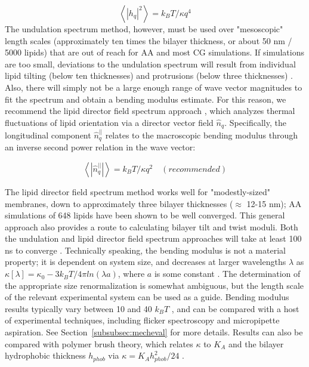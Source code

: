 \documentclass[9pt,bestpractices]{livecoms}
\begin{document}
\begin{equation}\label{eq:8}
	\left< \left|h_q \right|^2 \right> = k_BT/\kappa q^4
\end{equation}
The undulation spectrum method, however, must be used over "mesoscopic" length scales (approximately ten times the bilayer thickness, or about 50 nm / 5000 lipids) that are out of reach for AA and most CG simulations.
If simulations are too small, deviations to the undulation spectrum will result from individual lipid tilting (below ten thicknesses) and protrusions (below three thicknesses) \cite{Venable2015}.
Also, there will simply not be a large enough range of wave vector magnitudes to fit the spectrum and obtain a bending modulus estimate.
For this reason, we recommend the lipid director field spectrum approach \cite{Watson2012a,Venable2015}, which analyzes thermal fluctuations of lipid orientation via a director vector field $\hat{n}_q$.
Specifically, the longitudinal component $\hat{n}_q^{||}$ relates to the macroscopic bending modulus through an inverse second power relation in the wave vector:

\begin{equation}\label{eq:9}
	\left< \left|\hat{n}_q^{||} \right| \right> = k_BT/\kappa q^2 \quad (recommended)
\end{equation}
\parbox{8.5cm}{\sloppy
The lipid director field spectrum method works well for "modestly-sized" membranes, down to approximately three bilayer thicknesses ($\approx$ 12-15 nm); AA simulations of 648 lipids have been shown to be well converged.
This general approach also provides a route to calculating bilayer tilt and twist moduli.
Both the undulation and lipid director field spectrum approaches will take at least 100 ns to converge \cite{Venable2015}.
Technically speaking, the bending modulus is not a material property; it is dependent on system size, and decreases at larger wavelengths $\lambda$ as $\kappa[\lambda] = \kappa _0 - 3k_BT/4\pi ln(\lambda a)$, where $a$ is some constant \cite{Peliti1985}.
The determination of the appropriate size renormalization is somewhat ambiguous, but the length scale of the relevant experimental system can be used as a guide.
Bending modulus results typically vary between 10 and 40 $k_BT$ \cite{Venable2015}, and can be compared with a host of experimental techniques, including flicker spectroscopy and micropipette aspiration.
See Section~\ref{subsubsec:mecheval} for more details.
Results can also be compared with polymer brush theory, which relates $\kappa$ to $K_A$ and the bilayer hydrophobic thickness $h_{phob}$ via $\kappa = K_Ah_{phob}^2/24$ \cite{Rawicz2000}.}
\end{document}
